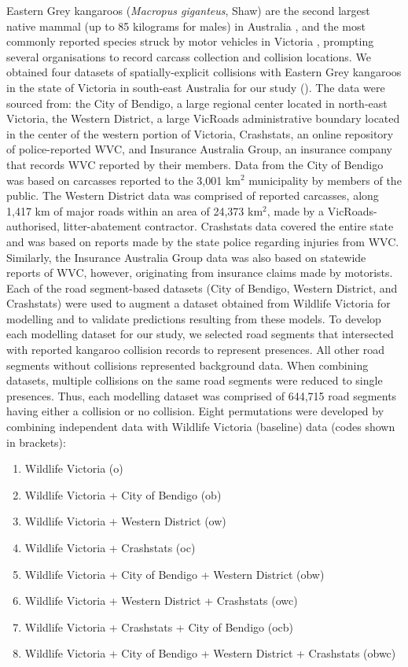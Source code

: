 Eastern Grey kangaroos (\textit{Macropus giganteus}, Shaw) are the second largest native mammal (up to 85 kilograms for males) in Australia \citep{coul10}, and the most commonly reported species struck by motor vehicles in Victoria \citep{rowd08}, prompting several organisations to record carcass collection and collision locations. We obtained four datasets of spatially-explicit collisions with Eastern Grey kangaroos in the state of Victoria in south-east Australia for our study (). The data were sourced from: the City of Bendigo, a large regional center located in north-east Victoria, the Western District, a large VicRoads administrative boundary located in the center of the western portion of Victoria, Crashstats, an online repository of police-reported WVC, and Insurance Australia Group, an insurance company that records WVC reported by their members. Data from the City of Bendigo was based on carcasses reported to the 3,001 km$^2$ municipality by members of the public. The Western District data was comprised of reported carcasses, along 1,417 km of major roads within an area of 24,373 km$^2$, made by a VicRoads-authorised, litter-abatement contractor. Crashstats data covered the entire state and was based on reports made by the state police regarding injuries from WVC. Similarly, the Insurance Australia Group data was also based on statewide reports of WVC, however, originating from insurance claims made by motorists. Each of the road segment-based datasets (City of Bendigo, Western District, and Crashstats) were used to augment a dataset obtained from Wildlife Victoria for modelling and to validate predictions resulting from these models. To develop each modelling dataset for our study, we selected road segments that intersected with reported kangaroo collision records to represent presences. All other road segments without collisions represented background data. When combining datasets, multiple collisions on the same road segments were reduced to single presences. Thus, each modelling dataset was comprised of 644,715 road segments having either a collision or no collision. Eight permutations were developed by combining independent data with Wildlife Victoria (baseline) data (codes shown in brackets):

\begin{enumerate}
	\item Wildlife Victoria (o)
	\item Wildlife Victoria + City of Bendigo (ob)
	\item Wildlife Victoria + Western District (ow)
	\item Wildlife Victoria + Crashstats (oc)
	\item Wildlife Victoria + City of Bendigo + Western District (obw)
	\item Wildlife Victoria + Western District + Crashstats (owc)
	\item Wildlife Victoria + Crashstats + City of Bendigo (ocb)
	\item Wildlife Victoria + City of Bendigo + Western District + Crashstats (obwc)
\end{enumerate}

